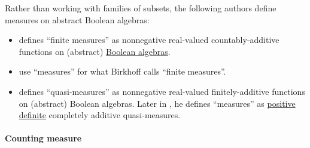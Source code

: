 \begin{remark}
  Rather than working with families of subsets, the following authors define measures on abstract Boolean algebras:
  \begin{itemize}
    \item {} defines \enquote{finite measures} as nonnegative real-valued countably-additive functions on (abstract) \hyperref[def:boolean_algebra]{Boolean algebras}.

    \item {} use \enquote{measures} for what Birkhoff calls \enquote{finite measures}.

    \item {} defines \enquote{quasi-measures} as nonnegative real-valued finitely-additive functions on (abstract) Boolean algebras. Later in \cite[58]{Владимиров1969БулевыАлгебры}, he defines \enquote{measures} as \hyperref[def:real_function_definiteness]{positive definite} completely additive quasi-measures.
  \end{itemize}
\end{remark}

\begin{concept}\label{con:measure_zero_set}
\end{concept}

\paragraph{Counting measure}

